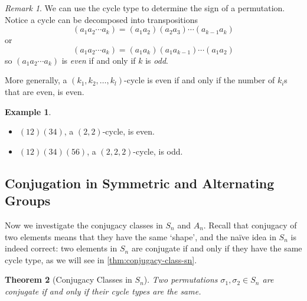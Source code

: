 \documentclass{article}
\newtheorem{theorem}{Theorem}[section]
\theoremstyle{definition}
\newtheorem*{example*}{Example}
\theoremstyle{remark}
\newtheorem{remark}[theorem]{Remark}
\newcommand{\pqty}[1]{\left(#1\right)}
\newcommand{\perm}[1]{(#1)}
\begin{document}
\begin{remark}
    We can use the cycle type to determine the sign of a permutation. Notice a cycle can be decomposed into transpositions
    \[
        \perm{{a_1} {a_2} \cdots {a_k}} = \perm{{a_1} {a_2}} \perm{{a_2} {a_3}} \cdots \perm{{a_{k - 1}}{a_k}}
    \]
    or
    \[
        \perm{{a_1} {a_2} \cdots {a_k}} = \perm{{a_1} {a_k}} \perm{{a_1} {a_{k - 1}}} \cdots \perm{{a_1} {a_2}}
    \]
    so \(\perm{{a_1} {a_2} \cdots {a_k}}\) is \emph{even} if and only if \(k\) is \emph{odd}.

    More generally, a \(\pqty{k_1, k_2, \ldots, k_l}\)-cycle is even if and only if the number of \(k_i\)s that are even, is even.
\end{remark}

\begin{example*}
    \begin{itemize}
        \item \(\perm{12}\perm{34}\), a \(\pqty{2, 2}\)-cycle, is even.

        \item \(\perm{12}\perm{34}\perm{56}\), a \(\pqty{2, 2, 2}\)-cycle, is odd.
    \end{itemize}
\end{example*}

\subsection{Conjugation in Symmetric and Alternating Groups}
\label{sec:conjugation-in-sn-an}

Now we investigate the conjugacy classes in \(S_n\) and \(A_n\). Recall that conjugacy of two elements means that they have the same `shape', and the na\"{i}ve idea in \(S_n\) is indeed correct: two elements in \(S_n\) are conjugate if and only if they have the same cycle type, as we will see in \autoref{thm:conjugacy-class-sn}.

\begin{theorem}[Conjugacy Classes in \(S_n\)]
    \label{thm:conjugacy-class-sn}
    Two permutations \(\sigma_1, \sigma_2 \in S_n\) are conjugate if and only if their cycle types are the same.
\end{theorem}
\end{document}
